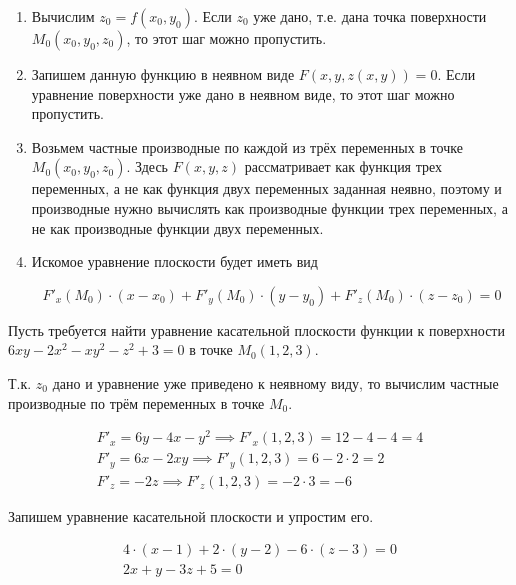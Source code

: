 \begin{enumerate}
\item
  Вычислим \(z_0 = f(x_0, y_0)\). Если \(z_0\) уже дано, т.е. дана точка
  поверхности \(M_0 (x_0, y_0, z_0)\), то этот шаг можно пропустить.

\item
  Запишем данную функцию в неявном виде \(F(x, y, z(x, y)) = 0\). Если уравнение
  поверхности уже дано в неявном виде, то этот шаг можно пропустить.

\item 
  Возьмем частные производные по каждой из трёх переменных в точке \(M_0 (x_0,
  y_0, z_0)\). Здесь \(F(x, y, z)\) рассматривает как функция трех переменных, а
  не как функция двух переменных заданная неявно, поэтому и производные нужно
  вычислять как производные функции трех переменных, а не как производные
  функции двух переменных.

\item
  Искомое уравнение плоскости будет иметь вид

  \begin{equation*}
    F'_x(M_0) \cdot (x - x_0)
    + F'_y(M_0) \cdot (y - y_0)
    + F'_z(M_0) \cdot(z - z_0)
    = 0
  \end{equation*}
\end{enumerate}

\begin{example}
  Пусть требуется найти уравнение касательной плоскости функции к поверхности 
  \(6 x y - 2 x^2 - x y^2 - z^2 + 3 = 0\) в точке \(M_0 (1, 2, 3)\).

  Т.к. \(z_0\) дано и уравнение уже приведено к неявному виду, то вычислим
  частные производные по трём переменных в точке \(M_0\).

  \begin{equation*}
    \begin{aligned}
      F'_x = 6y - 4x - y^2 \implies F'_x(1, 2, 3) = 12 - 4 - 4 = 4
    \\
      F'_y = 6x - 2xy \implies F'_y(1, 2, 3) = 6 - 2 \cdot 2 = 2
    \\
      F'_z = -2z \implies F'_z(1, 2, 3) = -2 \cdot 3 = -6
    \end{aligned}
  \end{equation*}
  
  Запишем уравнение касательной плоскости и упростим его.

  \begin{equation*}
    \begin{aligned}
      4 \cdot (x - 1) + 2 \cdot (y - 2) - 6 \cdot (z - 3) = 0
    \\
      2 x + y - 3 z + 5 = 0
    \end{aligned}
  \end{equation*}
\end{example}

